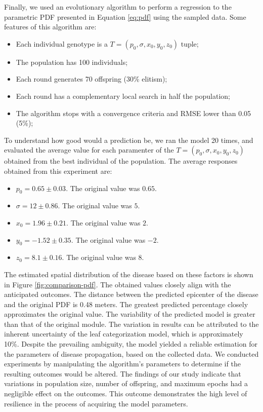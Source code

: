 Finally, we used an evolutionary algorithm to perform a regression to the parametric PDF presented in Equation \ref{eq:pdf} using the sampled data. Some features of this algorithm are:

\begin{itemize}
    \item Each individual genotype is a $T = (p_0, \sigma, x_0, y_0, z_0)$ tuple;
    \item The population has 100 individuals;
    \item Each round generates 70 offspring (30\% elitism);
    \item Each round has a complementary local search in half the population;
    \item The algorithm stops with a convergence criteria and RMSE lower than 0.05 (5\%);
\end{itemize}

To understand how good would a prediction be, we ran the model 20 times, and evaluated the average value for each paramenter of the $T = (p_0, \sigma, x_0, y_0, z_0)$ obtained from the best individual of the population. The average responses obtained from this experiment are:

\begin{itemize}
    \item $p_0 = 0.65 \pm 0.03$. The original value was $0.65$.
    \item $\sigma = 12 \pm 0.86$. The original value was $5$.
    \item $x_0 = 1.96 \pm 0.21$. The original value was $2$.
    \item $y_0 = -1.52 \pm 0.35$. The original value was $-2$.
    \item $z_0 = 8.1 \pm 0.16$. The original value was $8$.
\end{itemize}

The estimated spatial distribution of the disease based on these factors is shown in Figure \ref{fig:comparison-pdf}. The obtained values closely align with the anticipated outcomes. The distance between the predicted epicenter of the disease and the original PDF is 0.48 meters. The greatest predicted percentage closely approximates the original value. The variability of the predicted model is greater than that of the original module. The variation in results can be attributed to the inherent uncertainty of the leaf categorization model, which is approximately 10\%. Despite the prevailing ambiguity, the model yielded a reliable estimation for the parameters of disease propagation, based on the collected data. We conducted experiments by manipulating the algorithm's parameters to determine if the resulting outcomes would be altered. The findings of our study indicate that variations in population size, number of offspring, and maximum epochs had a negligible effect on the outcomes. This outcome demonstrates the high level of resilience in the process of acquiring the model parameters.


